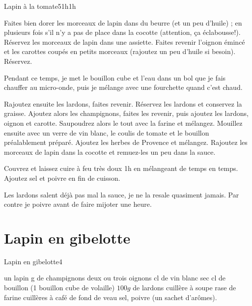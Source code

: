 {\begin{recette}{Lapin à la tomate}{5}{1h}{1h}
\begin{preparation}
\etape Faites bien dorer les morceaux de lapin dans du beurre (et un peu d'huile) ; en plusieurs fois s'il n'y a pas de place 
dans la cocotte (attention, ça éclabousse!).
\etape Réservez les morceaux de lapin dans une assiette.
\etape Faites revenir l'oignon émincé et les carottes coupés en petits morceaux (rajoutez un peu d'huile si besoin). Réservez.
\begin{remarque}
Pendant ce temps, je met le bouillon cube et l'eau dans un bol que je fais chauffer au micro-onde, puis je mélange avec une 
fourchette quand c'est chaud.
\end{remarque}
\etape Rajoutez ensuite les lardons, faites revenir. Réservez les lardons et conservez la graisse. 
\etape Ajoutez alors les champignons, faites les revenir, puis ajoutez les lardons, oignon et carotte.
\etape Saupoudrez alors le tout avec la farine et mélangez. 
\etape Mouillez ensuite avec un verre de vin blanc, le coulis de tomate et le bouillon préalablement préparé. Ajoutez les herbes 
de Provence et mélangez.
\etape Rajoutez les morceaux de lapin dans la cocotte et remuez-les un peu dans la sauce.
\end{preparation}

\begin{cuisson}
Couvrez et laissez cuire à feu très doux 1h en mélangeant de temps en temps. Ajoutez sel et poivre en fin de cuisson.
\begin{remarque}
Les lardons salent déjà pas mal la sauce, je ne la resale quasiment jamais. Par contre je poivre avant de faire mijoter une 
heure.
\end{remarque}
\end{cuisson}
\end{recette}

\section{Lapin en gibelotte}
\begin{recette}{Lapin en gibelotte}{4}{}{}
\begin{ingredients}
\ingredient un lapin
 g de champignons
\ingredient deux ou trois oignons
 cl de vin blanc sec
 cl de bouillon (1 bouillon cube de volaille)
\ingredient $100\unit{g}$ de lardons
 cuillère à soupe rase de farine
 cuillères à café de fond de veau
\ingredient sel, poivre (un sachet d'arômes).
\end{ingredients}


\end{recette}}
